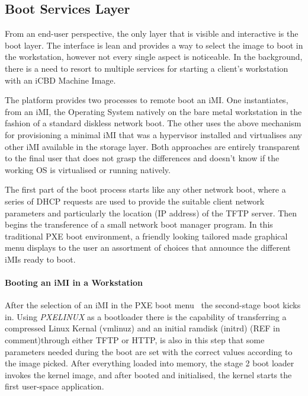 \subsection{Boot Services Layer}
\label{sub:icbd_boot_layer}

From an end-user perspective, the only layer that is visible and interactive is the boot layer. The interface is lean and provides a way to select the image to boot in the workstation, however not every single aspect is noticeable. In the background, there is a need to resort to multiple services for starting a client's workstation with an iCBD Machine Image.

The platform provides two processes to remote boot an iMI. One instantiates, from an iMI, the Operating System natively on the bare metal workstation in the fashion of a standard diskless network boot. The other uses the above mechanism for provisioning a minimal iMI that was a hypervisor installed and virtualises any other iMI available in the storage layer. Both approaches are entirely transparent to the final user that does not grasp the differences and doesn't know if the working OS is virtualised or running natively.

The first part of the boot process starts like any other network boot, where a series of DHCP requests are used to provide the suitable client network parameters and particularly the location (IP address) of the TFTP server. Then begins the transference of a small network boot manager program. In this traditional PXE boot environment, a friendly looking tailored made graphical menu displays to the user an assortment of choices that announce the different iMIs ready to boot.

\paragraph{Booting an iMI in a Workstation}
\label{subsub:icbd_booting_imi}
After the selection of an iMI in the PXE boot menu~\cite{ibm_linux_boot} the second-stage boot kicks in. Using \textit{PXELINUX} as a bootloader there is the capability of transferring a compressed Linux Kernal (vmlinuz) and an initial ramdisk (initrd) (REF in comment)through either TFTP or HTTP, is also in this step that some parameters needed during the boot are set with the correct values according to the image picked. After everything loaded into memory, the stage 2 boot loader invokes the kernel image, and after booted and initialised, the kernel starts the first user-space application. 

